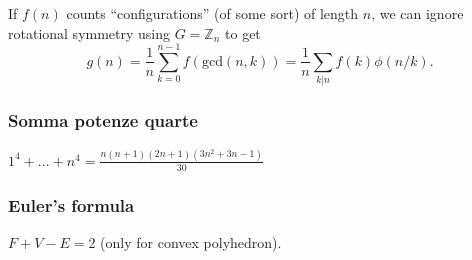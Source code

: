 		 If $f(n)$ counts ``configurations'' (of some sort) of length $n$, we can ignore rotational symmetry using $G = \mathbb Z_n$ to get
		 \[ g(n) = \frac 1 n \sum_{k=0}^{n-1}{f(\text{gcd}(n, k))} = \frac 1 n \sum_{k|n}{f(k)\phi(n/k)}. \]

\subsubsection{Somma potenze quarte}
$ 1^4+...+n^4=\frac{n(n+1)(2n+1)(3n^2+3n-1)}{30} $

\subsubsection{Euler's formula} $F+V-E=2$ (only for convex polyhedron).

